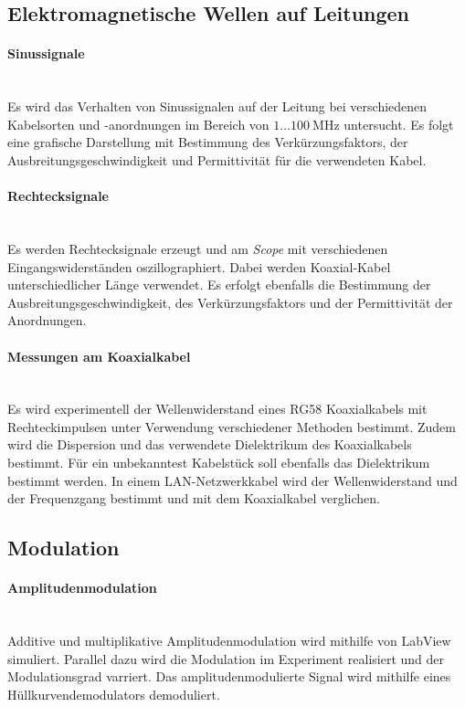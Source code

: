 \documentclass[a4paper,twoside,final]{article}
\begin{document}
\subsection{Elektromagnetische Wellen auf Leitungen}
\paragraph{Sinussignale}$~$\\
Es wird das Verhalten von Sinussignalen auf der Leitung bei verschiedenen Kabelsorten und -anordnungen im Bereich von $1\hdots\SI{100}{\mega\hertz}$ untersucht. Es folgt eine grafische Darstellung mit Bestimmung des Verkürzungsfaktors, der Ausbreitungsgeschwindigkeit und Permittivität für die verwendeten Kabel.
\paragraph{Rechtecksignale}$~$\\
Es werden Rechtecksignale erzeugt und am \textit{Scope} mit verschiedenen Eingangswiderständen oszillographiert. Dabei werden Koaxial-Kabel unterschiedlicher Länge verwendet. Es erfolgt ebenfalls die Bestimmung der Ausbreitungsgeschwindigkeit, des Verkürzungsfaktors und der Permittivität der Anordnungen.
\paragraph{Messungen am Koaxialkabel}$~$\\
Es wird experimentell der Wellenwiderstand eines RG58 Koaxialkabels mit Rechteckimpulsen unter Verwendung verschiedener Methoden bestimmt. Zudem wird die Dispersion und das verwendete Dielektrikum des Koaxialkabels bestimmt. Für ein unbekanntest Kabelstück soll ebenfalls das Dielektrikum bestimmt werden. In einem LAN-Netzwerkkabel wird der Wellenwiderstand und der Frequenzgang bestimmt und mit dem Koaxialkabel verglichen.

\subsection{Modulation}
\paragraph{Amplitudenmodulation}$~$\\
Additive und multiplikative Amplitudenmodulation wird mithilfe von LabView simuliert. Parallel dazu wird die Modulation im Experiment realisiert und der Modulationsgrad varriert. Das amplitudenmodulierte Signal wird mithilfe eines Hüllkurvendemodulators demoduliert.
\end{document}
